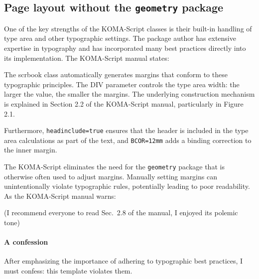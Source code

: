 \subsection{Page layout without the \texttt{geometry} package}
One of the key strengths of the KOMA-Script classes is their built-in handling of type area and other typographic settings. The package author has extensive expertise in typography and has incorporated many best practices directly into its implementation. The KOMA-Script manual states:
  \cite{koma_manual}

The scrbook class automatically generates margins that conform to these typographic principles. The DIV parameter controls the type area width: the larger the value, the smaller the margins. The underlying construction mechanism is explained in Section 2.2 of the KOMA-Script manual, particularly in Figure 2.1.

Furthermore, \verb|headinclude=true| ensures that the header is included in the type area calculations as part of the text, and \verb|BCOR=12mm| adds a binding correction to the inner margin.

The KOMA-Script eliminates the need for the \verb|geometry| package that is otherwise often used to adjust margins. Manually setting margins can unintentionally violate typographic rules, potentially leading to poor readability. As the KOMA-Script manual warns:

 \cite{koma_manual, willberg2000}
(I recommend everyone to read Sec.~2.8 of the manual, I enjoyed its polemic tone)

\paragraph{A confession} After emphasizing the importance of adhering to typographic best practices, I must confess: this template violates them.

